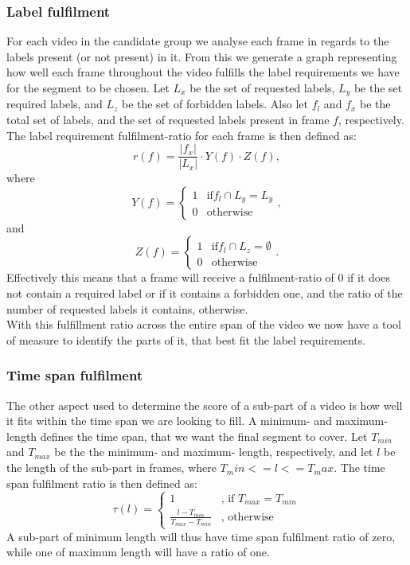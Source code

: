 \subsubsection{Label fulfilment}
%
For each video in the candidate group we analyse each frame in regards to the labels present (or not present) in it. From this we generate a graph representing how well each frame throughout the video fulfills the label requirements we have for the segment to be chosen. Let $L_{x}$ be the set of requested labels, $L_{y}$ be the set required labels, and $L_{z}$ be the set of forbidden labels. Also let $f_{l}$ and $f_{x}$ be the total set of labels, and the set of requested labels present in frame $f$, respectively. The label requirement fulfilment-ratio for each frame is then defined as:\\
%
\begin{equation}
r(f) = \frac{|f_{x}|}{|L_{x}|} \cdot Y(f) \cdot Z(f),
\end{equation} 
%
where
%
\begin{equation}
Y(f) =
\begin{cases}
1 & \text{if} f_{l} \cap L_{y} = L_{y}\\
0 &  \text{otherwise}
\end{cases},
\end{equation} 
%
and
%
\begin{equation}
Z(f) =
\begin{cases}
1 & \text{if} f_{l} \cap L_{z} = \emptyset\\
0 &  \text{otherwise}
\end{cases}.
\end{equation} 
%
Effectively this means that a frame will receive a fulfilment-ratio of 0 if it does not contain a required label or if it contains a forbidden one, and the ratio of the number of requested labels it contains, otherwise.\\
%
With this fulfillment ratio across the entire span of the video we now have a tool of measure to identify the parts of it, that best fit the label requirements.
%
\subsubsection{Time span fulfilment}
%
The other aspect used to determine the score of a sub-part of a video is how well it fits within the time span we are looking to fill. A minimum- and maximum- length defines the time span, that we want the final segment to cover. Let $T_{min}$ and $T_{max}$ be the the minimum- and maximum- length, respectively, and let $l$ be the length of the sub-part in frames, where $T_min <= l <= T_max$. The time span fulfilment ratio is then defined as:\\
%
\begin{equation}
\tau(l) =
\begin{cases}
1 & \text{, if } T_{max} = T_{min}\\
\frac{l-T_{min}}{T_{max}-T_{min}} &  \text{, otherwise}
\end{cases}
\end{equation}\label{equ:fulfilment}
%
A sub-part of minimum length will thus have time span fulfilment ratio of zero, while one of maximum length will have a ratio of one. 
%
